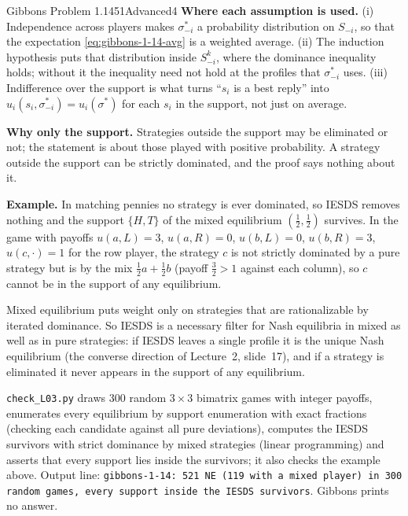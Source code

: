 \begin{exsol}{Gibbons Problem 1.14}{51}{Advanced}{4}
\textbf{Where each assumption is used.} (i) Independence across players makes $\sigma_{-i}^*$ a
probability distribution on $S_{-i}$, so that the expectation \eqref{eq:gibbons-1-14-avg} is a weighted
average. (ii) The induction hypothesis puts that distribution inside $S_{-i}^k$, where the dominance
inequality holds; without it the inequality need not hold at the profiles that $\sigma_{-i}^*$ uses.
(iii) Indifference over the support is what turns ``$s_i$ is a best reply'' into
$u_i(s_i, \sigma_{-i}^*) = u_i(\sigma^*)$ for each $s_i$ in the support, not just on average.

\textbf{Why only the support.} Strategies outside the support may be eliminated or not; the
statement is about those played with positive probability. A strategy outside the support can be
strictly dominated, and the proof says nothing about it.

\textbf{Example.} In matching pennies no strategy is ever dominated, so IESDS removes nothing and
the support $\{H, T\}$ of the mixed equilibrium $(\frac12,\frac12)$ survives. In the game with payoffs
$u(a, L) = 3$, $u(a, R) = 0$, $u(b, L) = 0$, $u(b, R) = 3$, $u(c, \cdot) = 1$ for the row player, the
strategy $c$ is not strictly dominated by a pure strategy but is by the mix $\frac12 a + \frac12 b$
(payoff $\frac32 > 1$ against each column), so $c$ cannot be in the support of any equilibrium.

\interp Mixed equilibrium puts weight only on strategies that are rationalizable by iterated
dominance. So IESDS is a necessary filter for Nash equilibria in mixed as well as in pure strategies:
if IESDS leaves a single profile it is the unique Nash equilibrium (the converse direction of
Lecture~2, slide~17), and if a strategy is eliminated it never appears in the support of any equilibrium.

\verify \texttt{check\_L03.py} draws 300 random $3\times3$ bimatrix games with integer payoffs,
enumerates every equilibrium by support enumeration with exact fractions (checking each candidate
against all pure deviations), computes the IESDS survivors with strict dominance by mixed
strategies (linear programming) and asserts that every support lies inside the survivors; it also
checks the example above. Output line: \texttt{gibbons-1-14: 521 NE (119 with a mixed player) in 300
random games, every support inside the IESDS survivors}. Gibbons prints no answer.


\end{exsol}
